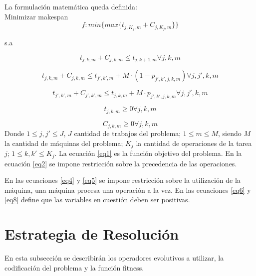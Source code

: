 \documentclass[journal]{IEEEtran}
\begin{document}
La formulación matemática queda definida:\\

Minimizar makespan
\begin{equation}
\label{eq1}
  f: min \{ max\{t_{j,K_{j},m}+C_{j,K_{j},m}\} \}
\end{equation}

s.a

\begin{equation}
\label{eq2}
  t_{j,k,m} + C_{j,k,m} \leq t_{j,k+1,m} \forall j,k,m
\end{equation}


\begin{equation}
\label{eq4}
   t_{j,k,m} + C_{j,k,m} \leq t_{j',k',m} + M \cdot (1- p_{j',k',j,k,m}) \forall j,j',k,m
\end{equation}

\begin{equation}
\label{eq5}
   t_{j',k',m} + C_{j',k',m} \leq t_{j,k,m} + M \cdot p_{j',k',j,k,m} \forall j,j',k,m
\end{equation}

\begin{equation}
\label{eq6}
  t_{j,k,m} \geq 0   \forall j,k,m
\end{equation}

\begin{equation}
\label{eq8}
  C_{j,k,m} \geq 0 \forall j,k,m
\end{equation}
Donde $1 \leq j,j' \leq J$, $J$ cantidad de trabajos del problema; $1 \leq m \leq M$, siendo $M$ la cantidad de máquinas del problema; $K_{j}$ la cantidad de operaciones de la tarea $j$; $1\leq k,k' \leq K_{j}$.
La ecuación \eqref{eq1} es la función objetivo del problema.
En la ecuación \eqref{eq2} se impone restricción sobre la precedencia de las operaciones. 

En las ecuaciones \eqref{eq4} y \eqref{eq5} se impone restricción sobre la utilización de la máquina, una máquina procesa una operación a la vez.
En las ecuaciones \eqref{eq6} y \eqref{eq8} define que las variables en cuestión deben ser positivas.


\newpage


\section{Estrategia de Resolución}
En esta subsección se describirán los operadores evolutivos a utilizar, la codificación del problema y la función fitness.
\end{document}
